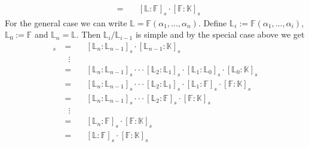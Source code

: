 \documentclass[12pt]{book}
\begin{document}
\begin{spacing}{1.3}
\begin{compactenum}
\begin{alignat*}{5}
&=&& \ [\mathbb{L}:\mathbb{F}]_s \cdot [\mathbb{F}:\mathbb{K}]_s
\end{alignat*}
For the general case we can write $\mathbb{L}=\mathbb{F}(\alpha_1, \ldots, \alpha_n)$. Define $\mathbb{L}_i:=\mathbb{F}(\alpha_1, \ldots, \alpha_i)$, $\mathbb{L}_0:=\mathbb{F}$ and $\mathbb{L}_n=\mathbb{L}$. Then $\mathbb{L}_i / \mathbb{L}_{i-1}$ is simple and by the special case above we get
\begin{alignat*}{5}
[\mathbb{L}:\mathbb{K}]_s \ &=&& \ [\mathbb{L}_n:\mathbb{L}_{n-1}]_s \cdot [\mathbb{L}_{n-1}:\mathbb{K}]_s \\
&\ \ \vdots&& \\
&=&& \ [\mathbb{L}_n:\mathbb{L}_{n-1}]_s \cdot \cdot \cdot [\mathbb{L}_2:\mathbb{L}_1]_s \cdot [\mathbb{L}_1:\mathbb{L}_0]_s \cdot [\mathbb{L}_0:\mathbb{K}]_s \\
&=&& \ [\mathbb{L}_n:\mathbb{L}_{n-1}]_s \cdot \cdot \cdot [\mathbb{L}_2:\mathbb{L}_1]_s \cdot [\mathbb{L}_1:\mathbb{F}]_s \cdot [\mathbb{F}:\mathbb{K}]_s \\
&=&& \ [\mathbb{L}_n:\mathbb{L}_{n-1}]_s \cdot \cdot \cdot [\mathbb{L}_2:\mathbb{F}]_s \cdot [\mathbb{F}:\mathbb{K}]_s \\
&\ \ \vdots&&\\
&=&& \ [\mathbb{L}_n:\mathbb{F}]_s \cdot [\mathbb{F}:\mathbb{K}]_s \\
&=&& \ [\mathbb{L}:\mathbb{F}]_s \cdot [\mathbb{F}:\mathbb{K}]_s
\end{alignat*}

\end{compactenum}


\end{spacing}
\end{document}

